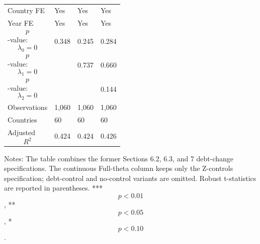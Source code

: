 \begin{table}[H]
\begin{threeparttable}
\begin{tabularx}{\textwidth}{lYYY}
Country FE & Yes & Yes & Yes \\
Year FE & Yes & Yes & Yes \\
$$p$$-value: $$\lambda_0=0$$ & 0.348 & 0.245 & 0.284 \\
$$p$$-value: $$\lambda_1=0$$ &  & 0.737 & 0.660 \\
$$p$$-value: $$\lambda_2=0$$ &  &  & 0.144 \\
Observations & 1,060 & 1,060 & 1,060 \\
Countries & 60 & 60 & 60 \\
Adjusted $$R^2$$ & 0.424 & 0.424 & 0.426 \\
\bottomrule
\end{tabularx}
\begin{tablenotes}[flushleft]\footnotesize
\item Notes: The table combines the former Sections 6.2, 6.3, and 7 debt-change specifications. The continuous Full-theta column keeps only the Z-controls specification; debt-control and no-control variants are omitted. Robust t-statistics are reported in parentheses. *** $$p<0.01$$, ** $$p<0.05$$, * $$p<0.10$$.
\end{tablenotes}
\end{threeparttable}
\end{table}
